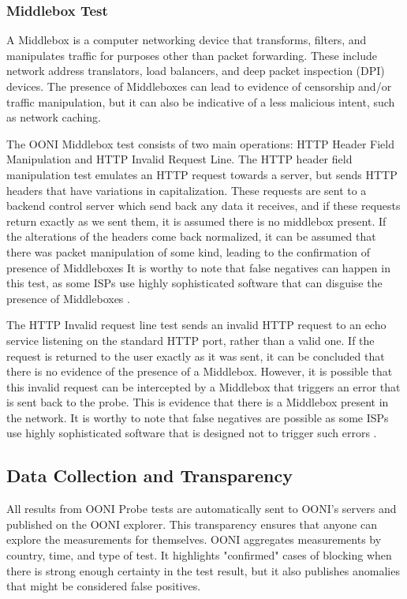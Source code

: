 \subsubsection{Middlebox Test}

A Middlebox is a computer networking device that transforms, filters, and manipulates traffic for purposes other than packet forwarding. These include network address translators, load balancers, and deep packet inspection (DPI) devices. The presence of Middleboxes can lead to evidence of censorship and/or traffic manipulation, but it can also be indicative of a less malicious intent, such as network caching.

The OONI Middlebox test consists of two main operations: HTTP Header Field Manipulation and HTTP Invalid Request Line. The HTTP header field manipulation test emulates an HTTP request towards a server, but sends HTTP headers that have variations in capitalization. These requests are sent to a backend control server which send back any data it receives, and if these requests return exactly as we sent them, it is assumed there is no middlebox present. If the alterations of the headers come back normalized, it can be assumed that there was packet manipulation of some kind, leading to the confirmation of presence of Middleboxes It is worthy to note that false negatives can happen in this test, as some ISPs use highly sophisticated software that can disguise the presence of Middleboxes \cite{ooniHTTPHeader}.  

The HTTP Invalid request line test sends an invalid HTTP request to an echo service listening on the standard HTTP port, rather than a valid one. If the request is returned to the user exactly as it was sent, it can be concluded that there is no evidence of the presence of a Middlebox. However, it is possible that this invalid request can be intercepted by a Middlebox that triggers an error that is sent back to the probe. This is evidence that there is a Middlebox present in the network. It is worthy to note that false negatives are possible as some ISPs use highly sophisticated software that is designed not to trigger such errors \cite{ooniHTTPInvalid}. 

\subsection{Data Collection and Transparency}

All results from OONI Probe tests are automatically sent to OONI's servers and published on the OONI explorer. This transparency ensures that anyone can explore the measurements for themselves. OONI aggregates measurements by country, time, and type of test. It highlights "confirmed" cases of blocking when there is strong enough certainty in the test result, but it also publishes anomalies that might be considered false positives. 

